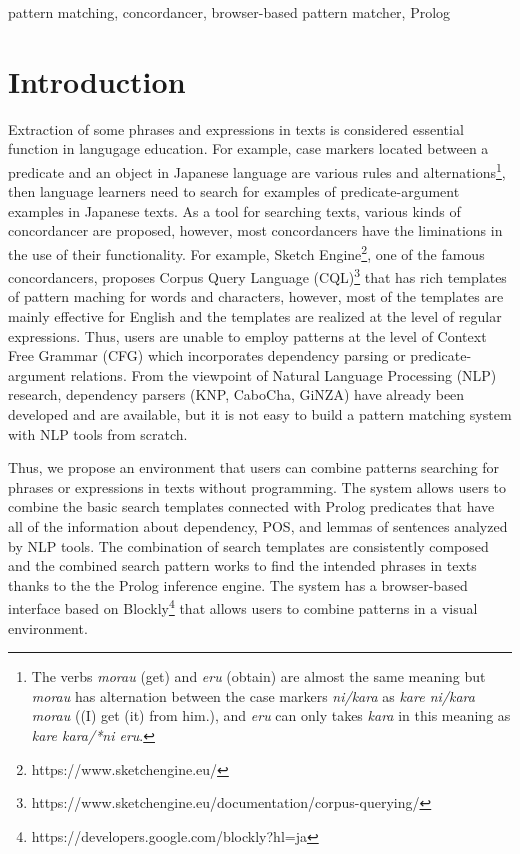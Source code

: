\documentclass[conference]{IEEEtran}
\begin{document}
\begin{IEEEkeywords}
  pattern matching, concordancer, browser-based pattern matcher, Prolog
\end{IEEEkeywords}

\section{Introduction}
Extraction of some phrases and expressions in texts is considered essential function in langugage education.
For example, case markers located between a predicate and an object in Japanese language are various
rules and alternations\footnote{The verbs {\it morau} (get) and {\it eru} (obtain) are almost the same meaning
but {\it morau} has alternation between the case markers {\it ni/kara} as {\it kare ni/kara morau}
((I) get (it) from him.), and 
{\it eru} can only takes {\it kara} in this meaning as {\it kare kara/*ni eru}.},
then language learners need to search for examples of predicate-argument
examples in Japanese texts. 
As a tool for searching texts, various kinds of concordancer are proposed, however, 
most concordancers have the liminations in the use of their functionality.
For example, Sketch Engine\footnote{https://www.sketchengine.eu/}, one of the famous concordancers,
proposes Corpus Query Language (CQL)\footnote{https://www.sketchengine.eu/documentation/corpus-querying/}
that has rich templates of pattern maching for words and characters, however, 
most of the templates are mainly effective for English and the templates are realized 
at the level of regular expressions. Thus, users are unable to employ patterns at the level of Context
Free Grammar (CFG) which incorporates dependency parsing or predicate-argument relations.
From the viewpoint of Natural Language Processing (NLP) research,
dependency parsers (KNP, CaboCha, GiNZA) have already been developed and are available, but it is not easy to
build a pattern matching system with NLP tools from scratch. 

Thus, we propose an environment that users can combine patterns
searching for phrases or expressions in texts without programming.
The system allows users to combine the basic search templates
connected with Prolog predicates that have all of the information
about dependency, POS, and lemmas of sentences analyzed by NLP tools. 
The combination of search templates are consistently composed and the
combined search pattern works to find the intended phrases in texts thanks to
the the Prolog inference engine. 
The system has a browser-based interface based on Blockly\footnote{https://developers.google.com/blockly?hl=ja}
that allows users to combine patterns in a visual environment. 
\end{document}
